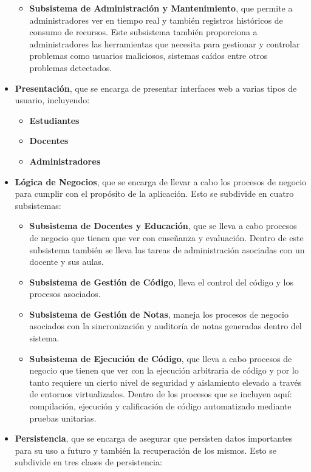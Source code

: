 \begin{itemize}
\begin{itemize}
        \item \textbf{Subsistema de Administración y Mantenimiento}, que permite a administradores ver en tiempo real y también registros históricos de consumo de recursos. Este subsistema también proporciona a administradores las herramientas que necesita para gestionar y controlar problemas como usuarios maliciosos, sistemas caídos entre otros problemas detectados.
    \end{itemize}
    \item \textbf{Presentación}, que se encarga de presentar interfaces web a varias tipos de usuario, incluyendo:
    \begin{itemize}
    	\item \textbf{Estudiantes}
		\item \textbf{Docentes}
		\item \textbf{Administradores}
    \end{itemize}
    \item \textbf{Lógica de Negocios}, que se encarga de llevar a cabo los procesos de negocio para cumplir con el propósito de la aplicación. Esto se subdivide en cuatro subsistemas:
    \begin{itemize}
    	\item \textbf{Subsistema de Docentes y Educación}, que se lleva a cabo procesos de negocio que tienen que ver con enseñanza y evaluación. Dentro de este subsistema también se lleva las tareas de administración asociadas con un docente y sus aulas.
        \item \textbf{Subsistema de Gestión de Código}, lleva el control del código y los procesos asociados. 
        \item \textbf{Subsistema de Gestión de Notas}, maneja los procesos de negocio asociados con la sincronización y auditoría de notas generadas dentro del sistema. 
        \item \textbf{Subsistema de Ejecución de Código}, que lleva a cabo procesos de negocio que tienen que ver con la ejecución arbitraria de código y por lo tanto requiere un cierto nivel de seguridad y aislamiento elevado a través de entornos virtualizados. Dentro de los procesos que se incluyen aquí: compilación, ejecución y calificación de código automatizado mediante pruebas unitarias.  
    \end{itemize}
    \item \textbf{Persistencia}, que se encarga de asegurar que persisten datos importantes para su uso a futuro y también la recuperación de los mismos. Esto se subdivide en tres clases de persistencia:

\end{itemize}

